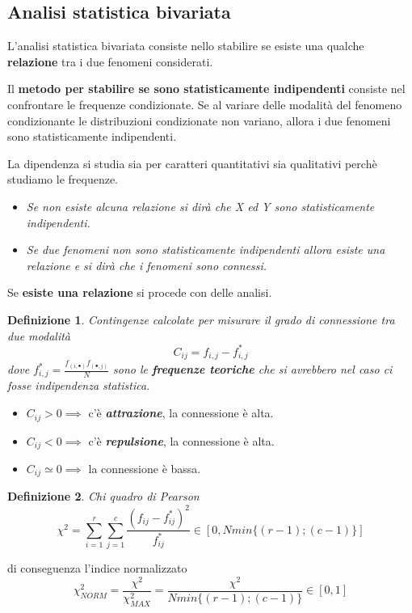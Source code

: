 \documentclass{article}
\newtheorem{definition}{Definizione}[section]
\begin{document}
     \subsection{Analisi statistica bivariata}
        L'analisi statistica bivariata consiste nello stabilire se esiste una qualche \textbf{relazione} tra i due fenomeni considerati.
       
        Il \textbf{metodo per stabilire se sono statisticamente indipendenti} consiste nel confrontare le frequenze condizionate. Se al variare delle modalità del fenomeno condizionante le distribuzioni condizionate non variano, allora i due fenomeni sono statisticamente indipendenti.
        
        La dipendenza si studia sia per caratteri quantitativi sia qualitativi perchè studiamo le frequenze. 
            \begin{itemize}
                \item \textit{Se non esiste alcuna relazione si dirà che X ed Y sono statisticamente indipendenti.}
                \item \textit{  Se due fenomeni non sono statisticamente indipendenti allora esiste una relazione e si dirà che i fenomeni sono connessi.}
            \end{itemize}{}
            
         Se \textbf{esiste una relazione} si procede con delle analisi. 
          \begin{definition}{Contingenze} calcolate per misurare il grado di connessione tra due   modalità
                $$C_{ij}=f_{i,j}-f^*_{i,j}$$
                 dove $f^*_{i,j} = \frac{f_{(i,\bullet)}f_{(\bullet,j)}}{N}$ sono le \textit{\textbf{frequenze teoriche}} che si avrebbero nel caso ci fosse \textit{indipendenza statistica}. 
            \end{definition}
        
         
            \begin{itemize}
                \item $C_{ij} > 0 \implies$  c'è \textbf{\textit{attrazione}}, la connessione è alta. 
                \item $C_{ij} < 0 \implies$ c'è \textbf{\textit{repulsione}}, la connessione è alta. 
                \item $C_{ij} \simeq 0 \implies$ la connessione è bassa. 
            \end{itemize}{}
        
            \begin{definition}{Chi quadro di Pearson}
                    $$ \chi^2 = \sum_{i=1}^{r} \sum_{j=1}^{c}\frac{(f_{ij}-f^*_{ij})^2}{f^*_{ij}} \in [0,N min\{(r-1);(c-1)\}]$$
            \end{definition}
            di conseguenza l'indice normalizzato 
                $$\chi^2_{NORM} = \frac{\chi^2}{\chi^2_{MAX}}=\frac{\chi^2}{N min\{(r-1);(c-1)\}} \in [0,1] $$
        
\end{document}
